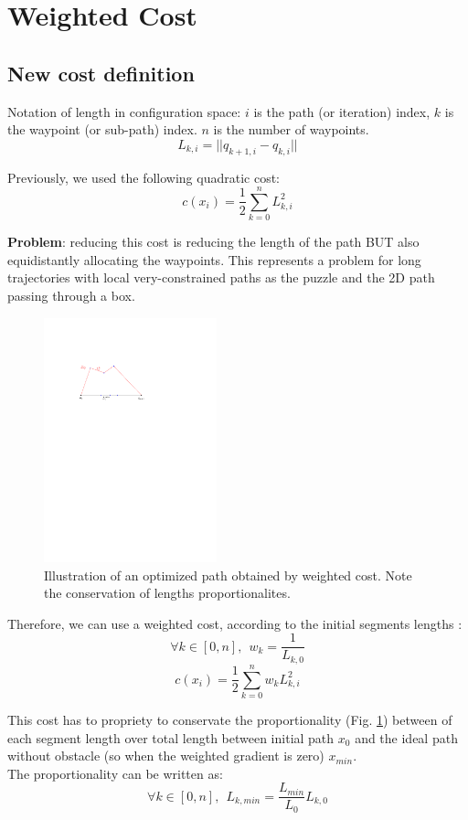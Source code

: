 \documentclass {article}
\begin{document}
\newpage

\section{Weighted Cost}
\subsection{New cost definition}
Notation of length in configuration space: $i$ is the path (or iteration) index, 
$k$ is the waypoint (or sub-path) index. $n$ is the number of waypoints.
$$
L_{k,i} = || q_{k+1,i} - q_{k,i} ||
$$

Previously, we used the following quadratic cost:
$$
c(x_i) = \frac{1}{2}\sum_{k=0}^n {L_{k,i}^2}
$$

\textbf{Problem}: reducing this cost is reducing the length of the path BUT also
equidistantly allocating the waypoints. This represents a problem for long 
trajectories with local very-constrained paths as the puzzle and the 2D path
passing through a box.

\vspace{0.5cm}

\begin{figure}
	\includegraphics[width=5cm]{weighted_path.pdf}
	\caption{Illustration of an optimized path obtained by weighted cost. Note the 
	conservation of lengths proportionalites.}
	\label{fig:weightedCost}
\end{figure}

Therefore, we can use a weighted cost, according to the initial segments lengths :
$$
\forall k \in [0,n], \ \ w_k = \frac{1}{L_{k,0}}
$$
$$
c(x_i) = \frac{1}{2}\sum_{k=0}^n w_k{L_{k,i}^2}
$$

This cost has to propriety to conservate the proportionality (Fig. \ref{fig:weightedCost}) between of 
each segment length over total length between initial path $x_0$ and the ideal path 
without obstacle (so when the weighted gradient is zero) $x_{min}$.\\
The proportionality can be written as:
$$
\forall k \in [0,n], \ \ L_{k,min} = \frac{L_{min}}{L_{0}}L_{k,0}
$$
\end{document}
